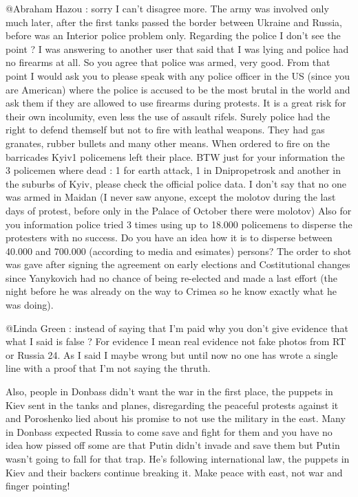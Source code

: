 \begin{itemize}
\begin{itemize}

@Abraham Hazou : sorry I can't disagree more. The army was involved only much
later, after the first tanks passed the border between Ukraine and Russia,
before was an Interior police problem only. Regarding the police I don't see
the point ? I was answering to another user that said that I was lying and
police had no firearms at all. So you agree that police was armed, very good.
From that point I would ask you to please speak with any police officer in the
US (since you are American) where the police is accused to be the most brutal
in the world and ask them if they are allowed to use firearms during protests.
It is a great risk for their own incolumity, even less the use of assault
rifels. Surely police had the right to defend themself but not to fire with
leathal weapons. They had gas granates, rubber bullets and many other means.
When ordered to fire on the barricades Kyiv1 policemens left their place. BTW
just for your information the 3 policemen where dead : 1 for earth attack, 1 in
Dnipropetrosk and another in the suburbs of Kyiv, please check the official
police data. I don't say that no one was armed in Maidan (I never saw anyone,
except the molotov during the last days of protest, before only in the Palace
of October there were molotov) Also for you information police tried 3 times
using up to 18.000 policemens to disperse the protesters with no success. Do
you have an idea how it is to disperse between 40.000 and 700.000 (according to
media and esimates) persons? The order to shot was gave after signing the
agreement on early elections and Costitutional changes since Yanykovich had no
chance of being re-elected and made a last effort (the night before he was
already on the way to Crimea so he know exactly what he was doing).


@Linda Green : instead of saying that I'm paid why you don't give evidence that
what I said is false ? For evidence I mean real evidence not fake photos from
RT or Russia 24. As I said I maybe wrong but until now no one has wrote a
single line with a proof that I'm not saying the thruth.



Also, people in Donbass didn't want the war in the first place, the puppets in
Kiev sent in the tanks and planes, disregarding the peaceful protests against
it and Poroshenko lied about his promise to not use the military in the east.
Many in Donbass expected Russia to come save and fight for them and you have no
idea how pissed off some are that Putin didn't invade and save them but Putin
wasn't going to fall for that trap. He's following international law, the
puppets in Kiev and their backers continue breaking it. Make peace with east,
not war and finger pointing!


\end{itemize}
\end{itemize}
